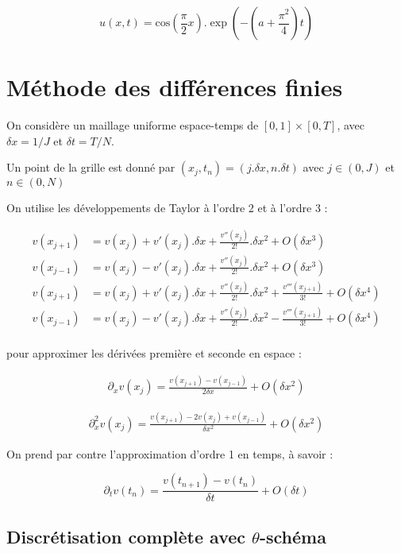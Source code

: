 \documentclass[french]{article}
\begin{document}
\[
u(x,t)=\mathrm{cos}(\frac{\pi}{2}x).\exp(-(a+\frac{\pi^{2}}{4})t)
\]

\section{Méthode des différences finies}

On considère un maillage uniforme espace-temps de $ [0,1] \times [0,T] $, avec $ \delta x = 1 / J $ et $ \delta t = T / N $.

Un point de la grille est donné par $ (x_{j},t_{n}) = (j.\delta x, n.\delta t) $ avec $ j \in (0,J) $ et $ n \in (0,N) $

On utilise les développements de Taylor à l'ordre 2 et à l'ordre 3 :

\begin{align}
v(x_{j+1}) &= v(x_{j}) + v'(x_{j}).\delta x + \frac{v''(x_{j})}{2!}.\delta x^{2} + O(\delta x^{3}) \\
v(x_{j-1}) &= v(x_{j}) - v'(x_{j}).\delta x + \frac{v''(x_{j})}{2!}.\delta x^{2} + O(\delta x^{3}) \\
v(x_{j+1}) &= v(x_{j}) + v'(x_{j}).\delta x + \frac{v''(x_{j})}{2!}.\delta x^{2} + \frac{v'''(x_{j+1})}{3!} + O(\delta x^{4}) \\
v(x_{j-1}) &= v(x_{j}) - v'(x_{j}).\delta x + \frac{v''(x_{j})}{2!}.\delta x^{2} - \frac{v'''(x_{j+1})}{3!} + O(\delta x^{4}) \\
\end{align}

pour approximer les dérivées première et seconde en espace :

\begin{align}
\partial_{x}v(x_{j})=\frac{v(x_{j+1})-v(x_{j-1})}{2\delta x}+O(\delta x^{2})
\end{align}

\begin{align}
\partial_{x}^{2}v(x_{j})=\frac{v(x_{j+1})-2v(x_{j})+v(x_{j-1})}{\delta x^{2}}+O(\delta x^{2})
\end{align}

On prend par contre l'approximation d'ordre 1 en temps, à savoir :

\[
\partial_{t}v(t_{n})= \frac{v(t_{n+1})-v(t_{n})}{\delta t} + O(\delta t)
\]

\subsection{Discrétisation complète avec $\theta$-schéma}
\end{document}
